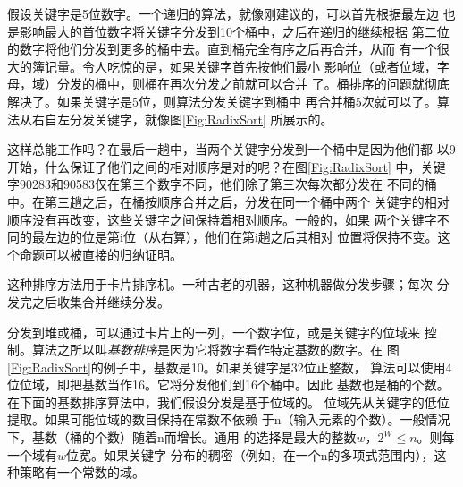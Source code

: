 \begin{figure*}[!t]
    \caption{基数排序}
    \label{Fig:RadixSort}
\end{figure*}

假设关键字是5位数字。一个递归的算法，就像刚建议的，可以首先根据最左边
也是影响最大的首位数字将关键字分发到10个桶中，之后在递归的继续根据
第二位的数字将他们分发到更多的桶中去。直到桶完全有序之后再合并，从而
有一个很大的簿记量。令人吃惊的是，如果关键字首先按他们最小
影响位（或者位域，字母，域）分发的桶中，则桶在再次分发之前就可以合并
了。桶排序的问题就彻底解决了。如果关键字是5位，则算法分发关键字到桶中
再合并桶5次就可以了。算法从右自左分发关键字，就像图\ref{Fig:RadixSort}
所展示的。

这样总能工作吗？在最后一趟中，当两个关键字分发到一个桶中是因为他们都
以9开始，什么保证了他们之间的相对顺序是对的呢？在图\ref{Fig:RadixSort}
中，关键字90283和90583仅在第三个数字不同，他们除了第三次每次都分发在
不同的桶中。在第三趟之后，在桶按顺序合并之后，分发在同一个桶中两个
关键字的相对顺序没有再改变，这些关键字之间保持着相对顺序。一般的，如果
两个关键字不同的最左边的位是第i位（从右算），他们在第i趟之后其相对
位置将保持不变。这个命题可以被直接的归纳证明。

这种排序方法用于卡片排序机。一种古老的机器，这种机器做分发步骤；每次
分发完之后收集合并继续分发。

分发到堆或桶，可以通过卡片上的一列，一个数字位，或是关键字的位域来
控制。算法之所以叫\emph{基数排序}是因为它将数字看作特定基数的数字。在
图\ref{Fig:RadixSort}的例子中，基数是10。如果关键字是32位正整数，
算法可以使用4位位域，即把基数当作16。它将分发他们到16个桶中。因此
基数也是桶的个数。在下面的基数排序算法中，我们假设分发是基于位域的。
位域先从关键字的低位提取。如果可能位域的数目保持在常数不依赖
于n（输入元素的个数）。一般情况下，基数（桶的个数）随着n而增长。通用
的选择是最大的整数$w$，$2^W\leq n$。则每一个域有$w$位宽。如果关键字
分布的稠密（例如，在一个n的多项式范围内），这种策略有一个常数的域。

